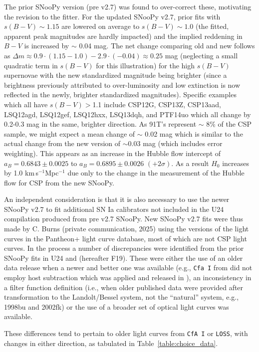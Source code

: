 The prior SNooPy version (pre v2.7) was found to over-correct these, motivating the revision to the fitter. For the updated SNooPy v2.7, prior fits with $s(B-V) \sim 1.15$ are lowered on average to $s(B-V) \sim 1.0$ (the fitted, apparent peak magnitudes are hardly impacted) and the implied reddening in $B-V$ is increased by $\sim$ 0.04 mag. The net change comparing old and new follows as $\Delta m \approx 0.9 \cdot (1.15-1.0)-2.9 \cdot(-0.04) \approx 0.25$ mag (neglecting a small quadratic term in $s(B-V)$ for this illustration) for the high $s(B-V)$ supernovae with the new standardized magnitude being brighter (since a brightness previously attributed to over-luminosity and low extinction is now reflected in the newly, brighter standardized magnitudes). Specific examples which all have $s(B-V)>$1.1 include CSP12G, CSP13Z, CSP13aad, LSQ12agd, LSQ12gef, LSQ12hxx, LSQ13dqh, and PTF14uo which all change by 0.2-0.3 mag in the same, brighter direction.  As 91T's represent $\sim$ 8\% of the CSP sample, we might expect a mean change of $\sim$ 0.02 mag which is similar to the actual change from the new version of $\sim$0.03 mag (which includes error weighting).  This appears as an increase in the Hubble flow intercept of $a_B=0.6843\pm0.0025$ to $a_B=0.6895\pm0.0026$ $(+2\sigma)$. As a result $H_0$ increases by 1.0 km\,s$^{-1}$Mpc$^{-1}$ due only to the change in the measurement of the Hubble flow for CSP from the new SNooPy.

An independent consideration is that it is also necessary to use the newer SNooPy v2.7 to fit additional SN Ia calibrators not included in the U24 compilation produced from pre v2.7 SNooPy.  New SNooPy v2.7 fits were thus made by C. Burns (private communication, 2025) using the versions of the light curves in the Pantheon+ light curve database, most of which are not CSP light curves.  In the process a number of discrepancies were identified from the prior SNooPy fits in U24 and \citet{2019ApJ...882...34F} (hereafter F19).  These were either the use of an older data release when a newer and better one was available (e.g., \texttt{Cfa I} from \citet{1999AJ....117..707R} did not employ host subtraction which was applied and released in \citet{2005ApJ...627..579R,2007ApJ...659...98R}), an inconsistency in a filter function definition (i.e., when older published data were provided after transformation to the Landolt/Bessel system, not the ``natural'' system, e.g., 1998bu and 2002fk)  or the use of a broader set of optical light curves was available. 

These differences tend to pertain to older light curves from \texttt{CfA I} or \texttt{LOSS}, with changes in either direction, as tabulated in Table~\ref{table:choice_data}. 

